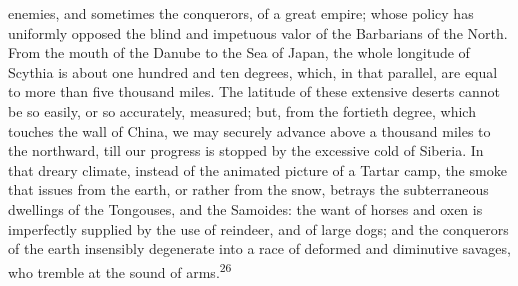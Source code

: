 enemies, and sometimes the conquerors, of a great empire; whose
policy has uniformly opposed the blind and impetuous valor of the
Barbarians of the North. From the mouth of the Danube to the Sea
of Japan, the whole longitude of Scythia is about one hundred and
ten degrees, which, in that parallel, are equal to more than five
thousand miles. The latitude of these extensive deserts cannot be
so easily, or so accurately, measured; but, from the fortieth
degree, which touches the wall of China, we may securely advance
above a thousand miles to the northward, till our progress is
stopped by the excessive cold of Siberia. In that dreary climate,
instead of the animated picture of a Tartar camp, the smoke that
issues from the earth, or rather from the snow, betrays the
subterraneous dwellings of the Tongouses, and the Samoides: the
want of horses and oxen is imperfectly supplied by the use of
reindeer, and of large dogs; and the conquerors of the earth
insensibly degenerate into a race of deformed and diminutive
savages, who tremble at the sound of arms.\textsuperscript{26}





